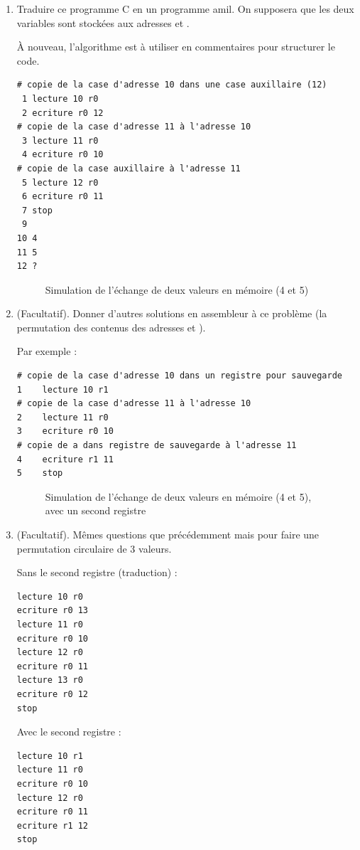 \begin{enumerate}
\item Traduire ce programme C en un programme amil. On supposera que les deux variables sont stockées aux adresses  et .
  \begin{correction}
    À nouveau, l'algorithme est à utiliser en commentaires pour
      structurer le code.
\begin{verbatim}
# copie de la case d'adresse 10 dans une case auxillaire (12)
 1 lecture 10 r0
 2 ecriture r0 12
# copie de la case d'adresse 11 à l'adresse 10
 3 lecture 11 r0
 4 ecriture r0 10
# copie de la case auxillaire à l'adresse 11
 5 lecture 12 r0
 6 ecriture r0 11
 7 stop
 9 
10 4
11 5
12 ?
\end{verbatim}
  \end{correction}
\begin{correction}
 \begin{figure}
  \centering
  
  \caption{Simulation de l'échange de deux valeurs en mémoire (4 et 5)}
  \label{simsw1}
\end{figure}
  \end{correction}
\item (Facultatif). Donner d'autres solutions en assembleur à ce problème (la permutation des contenus des adresses  et ).
  \begin{correction}
Par exemple : 
\begin{verbatim}
# copie de la case d'adresse 10 dans un registre pour sauvegarde
1    lecture 10 r1
# copie de la case d'adresse 11 à l'adresse 10
2    lecture 11 r0
3    ecriture r0 10
# copie de a dans registre de sauvegarde à l'adresse 11
4    ecriture r1 11
5    stop
\end{verbatim}
\begin{figure}
  \centering
  
  \caption{Simulation de l'échange de deux valeurs en mémoire (4 et 5), avec un second registre}
  \label{simsw2}
\end{figure}
  \end{correction}

\item (Facultatif). Mêmes questions que précédemment mais pour faire une permutation
  circulaire de 3 valeurs.

  \begin{correction}    


{\small
{}
}

Sans le second registre (traduction) :
\begin{verbatim}
lecture 10 r0  
ecriture r0 13 
lecture 11 r0  
ecriture r0 10 
lecture 12 r0  
ecriture r0 11 
lecture 13 r0  
ecriture r0 12 
stop
\end{verbatim}
Avec le second registre :
\begin{verbatim}
lecture 10 r1  
lecture 11 r0  
ecriture r0 10 
lecture 12 r0  
ecriture r0 11 
ecriture r1 12 
stop
\end{verbatim}
\end{correction}
\end{enumerate}


